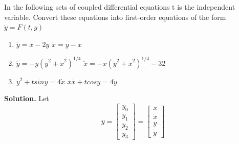 \begin{exercise}{4} %
In the following sets of coupled differential equations t is the independent variable.
Convert these equations into first-order equations of the form $\dot y = F(t,y)$
\begin{enumerate}
    \item $\ddot y=x-2y$ \qquad \qquad \qquad \qquad $\ddot x = y-x$  
    \item $\ddot y=-y(\dot y^2+\dot x^2)^{1/4}$ \qquad \qquad   $\ddot x = -x(\dot y^2+\dot x^2)^{1/4}-32$  
    \item $\ddot y^2+tsiny=4\dot x$ \qquad \qquad\qquad $x\ddot x + tcosy= 4\dot y$  
\end{enumerate}

\textbf{Solution.}
Let
        $$
        y=
        \begin{bmatrix}
        y_0\\ y_1\\ y_2 \\ y_3 
        \end{bmatrix}
        =
        \begin{bmatrix}
        x\\ \dot x \\  y \\ \dot y 
        \end{bmatrix}
        $$
        

\end{exercise}

